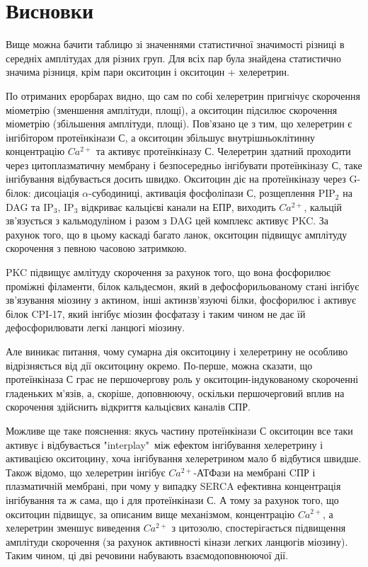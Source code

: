 \documentclass[12pt, a4paper]{article}
\begin{document}
\newpage
\thispagestyle{empty}
\section{Висновки\\}
\begin{center}
\end{center}
\par
Вище можна бачити таблицю зі значеннями статистичної значимості різниці в середніх амплітудах
для різних груп. Для всіх пар була знайдена статистично значима різниця, крім пари окситоцин і
окситоцин + хелеретрин.

По отриманих ерорбарах видно, що сам по собі хелеретрин пригнічує скорочення міометрію (зменшення
амплітуди, площі), а окситоцин підсилює скорочення міометрію (збільшення амплітуди, площі).
Пов'язано це з тим, що хелеретрин є інгібітором протеїнкінази С, а окситоцин
збільшує внутрішньоклітинну концентрацію $Ca^{2+}$ та активує протеїнкіназу С. Челеретрин здатний проходити через
цитоплазматичну мембрану і безпосередньо інгібувати
протеїнкіназу С, таке інгібування відбувається досить швидко. Окситоцин діє на протеїнкіназу
через G-білок: дисоціація $\alpha$-субодиниці, активація фосфоліпази С, розщеплення PIP$_2$ на
DAG та IP$_3$, IP$_3$ відкриває кальцієві канали на ЕПР, виходить $Ca^{2+}$, кальцій зв'язується
з кальмодуліном і разом з DAG цей комплекс активує PKC. За рахунок того, що в цьому каскаді
багато ланок, окситоцин підвищує амплітуду скорочення з певною часовою затримкою.

PKC підвищує амлітуду скорочення за рахунок того, що вона фосфорилює проміжні філаменти, білок
кальдесмон, який в дефосфорильованому стані інгібує зв'язування міозину з актином, інші
актинзв'язуючі білки, фосфорилює і активує білок CPI-17, який інгібує міозин
фосфатазу і таким чином не дає їй дефосфорилювати легкі ланцюгі міозину.
                                                                                
Але виникає питання, чому сумарна дія окситоцину і хелеретрину не особливо
відрізняється від дії окситоцину окремо. По-перше, можна сказати, що протеїнкіназа С грає не
першочергову роль у окситоцин-індукованому скороченні гладеньких м'язів, а,
скоріше, доповнюючу, оскільки першочерговий вплив на скорочення здійснить
відкриття кальцієвих каналів СПР.
\par
Можливе ще таке пояснення: якусь частину
протеїнкінази С окситоцин все таки активує і відбувається "interplay"\ між ефектом інгібування
хелеретрину і активацією окситоцину, хоча інгібування хелеретрином мало б
відбутися швидше. Також відомо, що хелеретрин інгібує $Ca^{2+}$-АТФази на
мембрані CПР і плазматичній мембрані, при чому у випадку SERCA ефективна концентрація інгібування та ж
сама, що і для протеїнкінази С. А тому за рахунок того, що окситоцин підвищує, за описаним
вище механізмом, концентрацію $Ca^{2+}$, а хелеретрин зменшує виведення $Ca^{2+}$ з цитозолю,
спостерігається підвищення амплітуди скорочення (за рахунок активності кінази
легких ланцюгів міозину). Таким чином, ці дві речовини набувають
взаємодоповнюючої дії.
\end{document}

